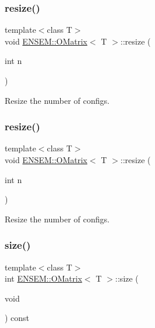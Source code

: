 \subsubsection{\texorpdfstring{resize()}{resize()}\hspace{0.1cm}{\footnotesize\ttfamily [2/3]}}
{\footnotesize\ttfamily template$<$class T$>$ \\
void \mbox{\hyperlink{classENSEM_1_1OMatrix}{E\+N\+S\+E\+M\+::\+O\+Matrix}}$<$ T $>$\+::resize (\begin{DoxyParamCaption}\item[{int}]{n }\end{DoxyParamCaption})\hspace{0.3cm}{\ttfamily [inline]}}



Resize the number of configs. 

\mbox{\label{classENSEM_1_1OMatrix_abb999e63b84b6d958e43443dc04e46be}} 
\subsubsection{\texorpdfstring{resize()}{resize()}\hspace{0.1cm}{\footnotesize\ttfamily [3/3]}}
{\footnotesize\ttfamily template$<$class T$>$ \\
void \mbox{\hyperlink{classENSEM_1_1OMatrix}{E\+N\+S\+E\+M\+::\+O\+Matrix}}$<$ T $>$\+::resize (\begin{DoxyParamCaption}\item[{int}]{n }\end{DoxyParamCaption})\hspace{0.3cm}{\ttfamily [inline]}}



Resize the number of configs. 

\mbox{\label{classENSEM_1_1OMatrix_a837821b951450cd49d3db25f566f5e47}} 
\subsubsection{\texorpdfstring{size()}{size()}\hspace{0.1cm}{\footnotesize\ttfamily [1/3]}}
{\footnotesize\ttfamily template$<$class T$>$ \\
int \mbox{\hyperlink{classENSEM_1_1OMatrix}{E\+N\+S\+E\+M\+::\+O\+Matrix}}$<$ T $>$\+::size (\begin{DoxyParamCaption}\item[{void}]{ }\end{DoxyParamCaption}) const\hspace{0.3cm}{\ttfamily [inline]}}



